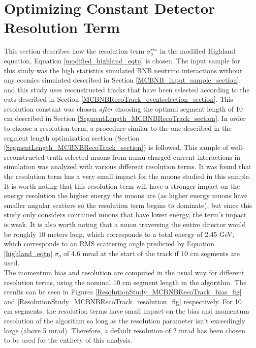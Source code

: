 \section{Optimizing Constant Detector Resolution Term}\label{ResolutionStudy_MCBNBRecoTrack_section}
This section describes how the resolution term $\sigma_o^{res}$ in the modified Highland equation, Equation \ref{modified_highland_eqtn} is chosen. The input sample for this study was the high statistics simulated BNB neutrino interactions without any cosmics simulated described in Section \ref{MCBNB_input_sample_section}, and this study uses reconstructed tracks that have been selected according to the cuts described in Section \ref{MCBNBRecoTrack_eventselection_section}. This resolution constant was chosen \textit{after} choosing the optimal segment length of 10 cm described in Section \ref{SegmentLength_MCBNBRecoTrack_section}. In order to choose a resolution term, a procedure similar to the one described in the segment length optimization section (Section \ref{SegmentLength_MCBNBRecoTrack_section}) is followed. This sample of well-reconstructed truth-selected muons from numu charged current interactions in simulation was analyzed with various different resolution terms. It was found that the resolution term has a very small impact for the muons studied in this sample. It is worth noting that this resolution term will have a stronger impact on the energy resolution the higher energy the muons are (as higher energy muons have smaller angular scatters so the resolution term begins to dominate), but since this study only considers contained muons that have lower energy, the term's impact is weak. It is also worth noting that a muon traversing the entire director would be roughly 10 meters long, which corresponds to a total energy of 2.45 GeV, which corresponds to an RMS scattering angle predicted by Equation \ref{highland_eqtn} $\sigma_o$ of 4.6 mrad at the start of the track if 10 cm segments are used.\\

The momentum bias and resolution are computed in the usual way for different resolution terms, using the nominal 10 cm segment length in the algorithm. The results can be seen in Figures \ref{ResolutionStudy_MCBNBRecoTrack_bias_fig} and \ref{ResolutionStudy_MCBNBRecoTrack_resolution_fig} respectively. For 10 cm segments, the resolution terms have small impact on the bias and momentum resolution of the algorithm so long as the resolution parameter isn't exceedingly large (above 5 mrad). Therefore, a default resolution of 2 mrad has been chosen to be used for the entirety of this analysis.

